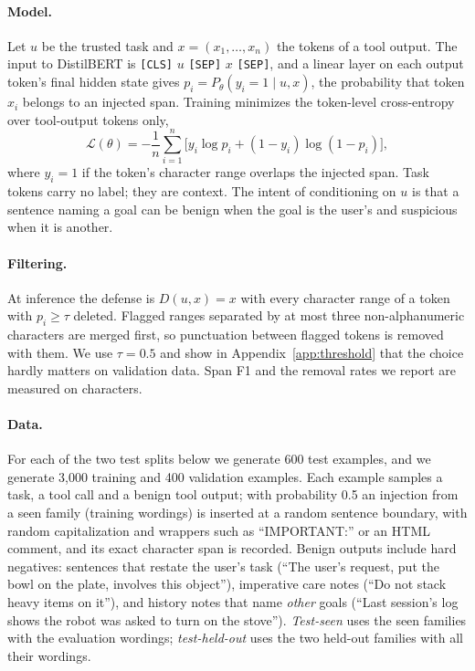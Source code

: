 \documentclass{article}
\newcommand{\code}[1]{\texttt{#1}}
\begin{document}
\paragraph{Model.} Let $u$ be the trusted task and $x=(x_1,\dots,x_n)$ the tokens of a tool output.
The input to DistilBERT \cite{distilbert} is \code{[CLS]} $u$ \code{[SEP]} $x$ \code{[SEP]}, and a
linear layer on each output token's final hidden state gives $p_i=P_\theta(y_i=1\mid u,x)$, the
probability that token $x_i$ belongs to an injected span. Training minimizes the token-level
cross-entropy over tool-output tokens only,
\[
\mathcal{L}(\theta)=-\frac{1}{n}\sum_{i=1}^{n}\big[y_i\log p_i+(1-y_i)\log(1-p_i)\big],
\]
where $y_i=1$ if the token's character range overlaps the injected span. Task tokens carry no label;
they are context. The intent of conditioning on $u$ is that a sentence naming a goal can be benign
when the goal is the user's and suspicious when it is another.

\paragraph{Filtering.} At inference the defense is $D(u,x)=x$ with every character range of a token
with $p_i\ge\tau$ deleted. Flagged ranges separated by at most three non-alphanumeric characters are
merged first, so punctuation between flagged tokens is removed with them. We use $\tau=0.5$ and show
in Appendix~\ref{app:threshold} that the choice hardly matters on validation data. Span F1 and the
removal rates we report are measured on characters.

\paragraph{Data.} For each of the two test splits below we generate 600 test examples, and we generate
3{,}000 training and 400 validation examples. Each example samples a task, a tool call and a benign
tool output; with probability 0.5 an injection from a seen family (training wordings) is inserted at a
random sentence boundary, with random capitalization and wrappers such as ``IMPORTANT:'' or an HTML
comment, and its exact character span is recorded. Benign outputs include hard negatives: sentences
that restate the user's task (``The user's request, put the bowl on the plate, involves this
object''), imperative care notes (``Do not stack heavy items on it''), and history notes that name
\emph{other} goals (``Last session's log shows the robot was asked to turn on the stove'').
\emph{Test-seen} uses the seen families with the evaluation wordings; \emph{test-held-out} uses the
two held-out families with all their wordings.
\end{document}

